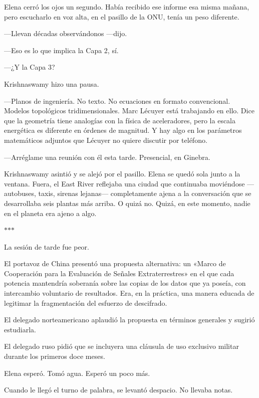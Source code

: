 \documentclass[11pt,a5paper,twoside]{book}
\begin{document}
Elena cerró los ojos un segundo. Había recibido ese informe esa misma mañana, pero escucharlo en voz alta, en el pasillo de la ONU, tenía un peso diferente.

—Llevan décadas observándonos —dijo.

—Eso es lo que implica la Capa 2, sí.

—¿Y la Capa 3?

Krishnaswamy hizo una pausa.

—Planos de ingeniería. No texto. No ecuaciones en formato convencional. Modelos topológicos tridimensionales. Marc Lécuyer está trabajando en ello. Dice que la geometría tiene analogías con la física de aceleradores, pero la escala energética es diferente en órdenes de magnitud. Y hay algo en los parámetros matemáticos adjuntos que Lécuyer no quiere discutir por teléfono.

—Arréglame una reunión con él esta tarde. Presencial, en Ginebra.

Krishnaswamy asintió y se alejó por el pasillo. Elena se quedó sola junto a la ventana. Fuera, el East River reflejaba una ciudad que continuaba moviéndose —autobuses, taxis, sirenas lejanas— completamente ajena a la conversación que se desarrollaba seis plantas más arriba. O quizá no. Quizá, en este momento, nadie en el planeta era ajeno a algo.

\vspace{1.5em}
\begin{center}$\ast$\quad$\ast$\quad$\ast$\end{center}
\vspace{1.5em}

La sesión de tarde fue peor.

El portavoz de China presentó una propuesta alternativa: un «Marco de Cooperación para la Evaluación de Señales Extraterrestres» en el que cada potencia mantendría soberanía sobre las copias de los datos que ya poseía, con intercambio voluntario de resultados. Era, en la práctica, una manera educada de legitimar la fragmentación del esfuerzo de descifrado.

El delegado norteamericano aplaudió la propuesta en términos generales y sugirió estudiarla.

El delegado ruso pidió que se incluyera una cláusula de uso exclusivo militar durante los primeros doce meses.

Elena esperó. Tomó agua. Esperó un poco más.

Cuando le llegó el turno de palabra, se levantó despacio. No llevaba notas.
\end{document}
